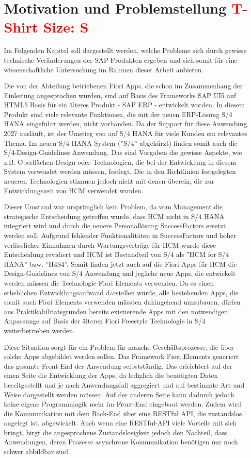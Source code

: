 \section{Motivation und Problemstellung \textcolor{red}{T-Shirt Size: S}}

Im Folgenden Kapitel soll dargestellt werden, welche Probleme sich durch gewisse technische Veränderungen der SAP Produkten ergeben und sich somit für eine wissenschaftliche Untersuchung im Rahmen dieser Arbeit anbieten.

Die von der Abteilung betriebenen Fiori Apps, die schon im Zusammenhang der Einleitung angesprochen wurden, sind auf Basis des Frameworks SAP UI5 auf HTML5 Basis für ein älteres Produkt - SAP ERP - entwickelt worden. In diesem Produkt sind viele relevante Funktionen, die mit der neuen ERP-Lösung S/4 HANA eingeführt werden, nicht vorhanden. Da der Support für diese Anwendung 2027 ausläuft, ist der Umstieg von auf S/4 HANA für viele Kunden ein relevantes Thema. Im neuen S/4 HANA System (''S/4'' abgekürzt) finden somit auch die S/4-Design-Guidelines Anwendung. Das sind Vorgaben die gewisse Aspekte, wie z.B. Oberflächen-Design oder Technologien, die bei der Entwicklung in diesem System verwendet werden müssen, festlegt. Die in den Richtlinien festgelegten neueren Technologien stimmen jedoch nicht mit denen überein, die zur Entwicklungszeit von HCM verwendet wurden.

Dieser Umstand war ursprünglich kein Problem, da vom Management die strategische Entscheidung getroffen wurde, dass HCM nicht in S/4 HANA integriert wird und durch die neuere Personallösung SuccessFactors ersetzt werden soll. Aufgrund fehlender Funktionalitäten in SuccessFactors und  hoher verlässlicher Einnahmen durch Wartungsverträge für HCM wurde diese Entscheidung revidiert und HCM ist Bestandteil von S/4 als ''HCM for S/4 HANA'' bzw. ''H4S4''. Somit finden jetzt auch auf die Fiori Apps für HCM die Design-Guidelines von S/4 Anwendung und jegliche neue Apps, die entwickelt werden müssen die Technologie Fiori Elements verwenden. Da es einen erheblichen Entwicklungsaufwand darstellen würde, alle bestehenden Apps, die somit auch Fiori Elements verwenden müssten dahingehend umzubauen, dürfen aus Praktikabilitätsgründen bereits existierende Apps mit den notwendigen Anpassunge auf Basis der älteren Fiori Freestyle Technologie in S/4 weiterbetrieben werden.

Diese Situation sorgt für ein Problem für manche Geschäftsprozesse, die über solche Apps abgebildet werden sollen. Das Framework Fiori Elements generiert das gesamte Front-End der Anwendung selbstständig. Das erleichtert auf der einen Seite die Entwicklung der Apps, da lediglich die benötigten Daten bereitgestellt und je nach Anwendungsfall aggregiert und auf bestimmte Art und Weise dargestellt werden müssen. Auf der anderen Seite kann dadurch jedoch keine eigene Programmlogik mehr im Front-End eingebaut werden. Zudem wird die Kommunikation mit dem Back-End über eine RESTful API, die zustandslos angelegt ist, abgewickelt. Auch wenn eine RESTful-API viele Vorteile mit sich bringt, birgt die angesprochene Zustandslosigkeit jedoch den Nachteil, dass Anwendungen, deren Prozesse asynchrone Kommunikation benötigen nur noch schwer abbildbar sind.


